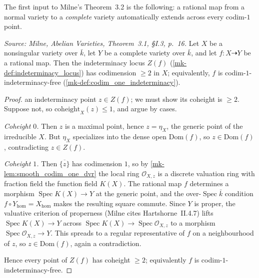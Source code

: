 The first input to Milne's Theorem~3.2 is the following: a rational map from a normal
variety to a \emph{complete} variety automatically extends across every codim-\(1\)
point.

\begin{theorem}\label{mk-thm:codim_one_extension}
  \leanok

  \textit{Source: Milne, \emph{Abelian Varieties}, Theorem~3.1, \S I.3, p.~16.}
  Let \(X\) be a nonsingular variety over \(\bar k\), let \(Y\) be a complete variety over
  \(\bar k\), and let \(f \colon X \dashrightarrow Y\) be a rational map. Then the
  indeterminacy locus \(Z(f)\) (\ref{mk-def:indeterminacy_locus}) has codimension
  \(\geq 2\) in \(X\); equivalently, \(f\) is codim-\(1\)-indeterminacy-free
  (\ref{mk-def:codim_one_indeterminacy}).
\end{theorem}
\begin{proof}
  \leanokFix an indeterminacy point \(z \in Z(f)\); we must show its coheight is \(\geq 2\).
  Suppose not, so \(\mathrm{coheight}_X(z) \leq 1\), and argue by cases.

  \emph{Coheight \(0\).} Then \(z\) is a maximal point, hence \(z = \eta_X\), the generic
  point of the irreducible \(X\). But \(\eta_X\) specializes into the dense open
  \(\mathrm{Dom}(f)\), so \(z \in \mathrm{Dom}(f)\), contradicting \(z \in Z(f)\).

  \emph{Coheight \(1\).} Then \(\overline{\{z\}}\) has codimension \(1\), so by
  \ref{mk-lem:smooth_codim_one_dvr} the local ring \(\mathcal O_{X, z}\) is a discrete
  valuation ring with fraction field the function field \(K(X)\). The rational map \(f\)
  determines a morphism \(\operatorname{Spec} K(X) \to Y\) at the generic point, and the
  over-\(\operatorname{Spec}\bar k\) condition \(f \circ Y_{\mathrm{hom}} =
  X_{\mathrm{hom}}\) makes the resulting square commute. Since \(Y\) is proper, the
  valuative criterion of properness (Milne cites Hartshorne~II.4.7) lifts
  \(\operatorname{Spec} K(X) \to Y\) across \(\operatorname{Spec} K(X) \to
  \operatorname{Spec}\mathcal O_{X, z}\) to a morphism \(\operatorname{Spec}
  \mathcal O_{X, z} \to Y\). This spreads to a regular representative of \(f\) on a
  neighbourhood of \(z\), so \(z \in \mathrm{Dom}(f)\), again a contradiction.

  Hence every point of \(Z(f)\) has coheight \(\geq 2\); equivalently \(f\) is
  codim-\(1\)-indeterminacy-free.
\end{proof}

